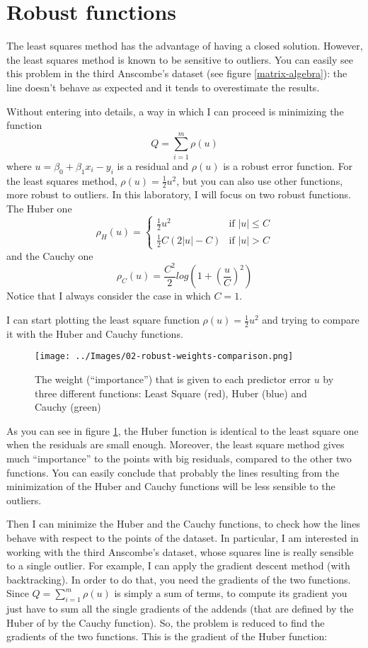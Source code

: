\section{Robust functions}
    The least squares method has the advantage of having a closed solution. However, the least squares method is known to be sensitive to outliers. You can easily see this problem in the third Anscombe's dataset (see figure \ref{matrix-algebra}): the line doesn't behave as expected and it tends to overestimate the results.\par
    Without entering into details, a way in which I can proceed is minimizing the function
    \[Q = \sum_{i=1}^{m}\rho(u)\]
    where \(u = \beta_0 + \beta_1 x_i - y_i\) is a residual and \(\rho(u)\) is a robust error function. For the least squares method, \(\rho(u) = \frac{1}{2}u^2\), but you can also use other functions, more robust to outliers. In this laboratory, I will focus on two robust functions. The Huber one
    \[
        \rho_H(u) =
        \begin{cases}
            \frac{1}{2}u^2 &            \text{if } |u| \leq C \\
            \frac{1}{2}C(2|u| - C) &    \text{if } |u| > C
        \end{cases}
    \]
    and the Cauchy one
    \[\rho_C(u) = \frac{C^2}{2}log\left(1 + \left(\frac{u}{C}\right)^2\right)\]
    Notice that I always consider the case in which \(C=1\).\par
    I can start plotting the least square function \(\rho(u) = \frac{1}{2}u^2\) and trying to compare it with the Huber and Cauchy functions.
    \begin{figure}
        \centering
        \texttt{[image: ../Images/02-robust-weights-comparison.png]}
        \caption{The weight (``importance'') that is given to each predictor error \(u\) by three different functions: Least Square (red), Huber (blue) and Cauchy (green)}
        \label{robust-weights-comparison}
    \end{figure}
    As you can see in figure \ref{robust-weights-comparison}, the Huber function is identical to the least square one when the residuals are small enough. Moreover, the least square method gives much ``importance'' to the points with big residuals, compared to the other two functions. You can easily conclude that probably the lines resulting from the minimization of the Huber and Cauchy functions will be less sensible to the outliers.\par
    Then I can minimize the Huber and the Cauchy functions, to check how the lines behave with respect to the points of the dataset. In particular, I am interested in working with the third Anscombe's dataset, whose squares line is really sensible to a single outlier. For example, I can apply the gradient descent method (with backtracking). In order to do that, you need the gradients of the two functions. Since \(Q = \sum_{i=1}^{m}\rho(u)\) is simply a sum of terms, to compute its gradient you just have to sum all the single gradients of the addends (that are defined by the Huber of by the Cauchy function). So, the problem is reduced to find the gradients of the two functions. This is the gradient of the Huber function:
